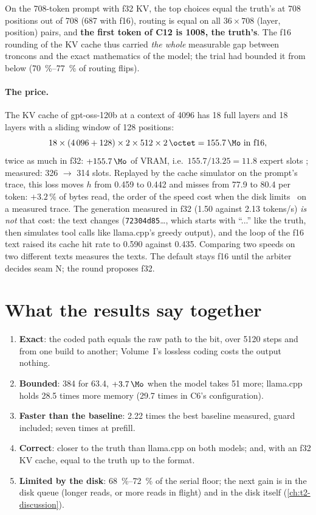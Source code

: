 On the 708-token prompt with f32 KV, the top choices equal the truth's at 708 positions out of 708 (687 with f16), routing is equal on all $36 \times 708$ (layer, position) pairs, and \textbf{the first token of C12 is 1008, the truth's}. The f16 rounding of the KV cache thus carried \emph{the whole} measurable gap between troncons and the exact mathematics of the model; the trial had bounded it from below (\SIrange{70}{77}{\percent} of routing flips).

\paragraph{The price.} The KV cache of gpt-oss-120b at a context of \num{4096} has 18 full layers and 18 layers with a sliding window of 128 positions:
\[
18 \times (4\,096 + 128) \times 2 \times 512 \times \SI{2}{\octet} = \SI{155.7}{\Mo} \text{ in f16},
\]
twice as much in f32: $+\SI{155.7}{\Mo}$ of VRAM, i.e.\ $155.7 / 13.25 = 11.8$ expert slots \calc; measured: 326 $\to$ 314 slots. Replayed by the cache simulator on the prompt's trace, this loss moves $h$ from \num{0.459} to \num{0.442} and misses from \num{77.9} to \num{80.4} per token: $+3.2\,\%$ of bytes read, the order of the speed cost when the disk limits \calc~on a measured trace. The generation measured in f32 (\num{1.50} against \num{2.13} tokens/s) \emph{is not} that cost: the text changes (\texttt{72304d85}…, which starts with ``...'' like the truth, then simulates tool calls like llama.cpp's greedy output), and the loop of the f16 text raised its cache hit rate to \num{0.590} against \num{0.435}. Comparing two speeds on two different texts measures the texts. The default stays f16 until the arbiter decides seam N; the round proposes f32.

\section{What the results say together}\label{t2res-sec:ensemble}

\begin{enumerate}
\item \textbf{Exact}: the coded path equals the raw path to the bit, over \num{5120} steps and from one build to another; Volume~I's lossless coding costs the output nothing.
\item \textbf{Bounded}: \SI{384}{\Mo} for \SI{63.4}{\Go}, $+\SI{3.7}{\Mo}$ when the model takes \SI{51}{\Go} more; llama.cpp holds \num{28.5} times more memory (\num{29.7} times in C6's configuration).
\item \textbf{Faster than the baseline}: \num{2.22} times the best baseline measured, guard included; seven times at prefill.
\item \textbf{Correct}: closer to the truth than llama.cpp on both models; and, with an f32 KV cache, equal to the truth up to the format.
\item \textbf{Limited by the disk}: \SIrange{68}{72}{\percent} of the serial floor; the next gain is in the disk queue (longer reads, or more reads in flight) and in the disk itself (\cref{ch:t2-discussion}).
\end{enumerate}

